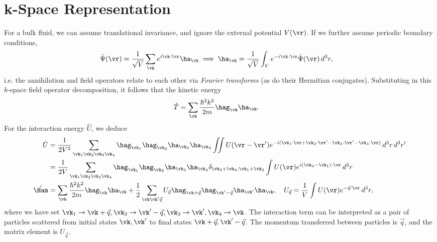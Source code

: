 \documentclass[a4paper, 11pt, normalem]{report}
\begin{document}
\section{k-Space Representation}
For a bulk fluid, we can assume translational invariance, and ignore the external potential $V(\vr)$.
If we further assume periodic boundary conditions,
\begin{align}
    \hat{\Psi}(\vr) &= \frac{1}{\sqrt{V}}\sum_{\vk}e^{i\vk\cdot\vr}\ha_{\vk} \implies \ha_{\vk} = \frac{1}{\sqrt{V}} \int_V e^{-i\vk\cdot\vr}\hat{\Psi}(\vr)\,d^3r,
\end{align}
i.e. the annihilation and field operators relate to each other via \emph{Fourier transforms} (as do their Hermitian conjugates).
Substituting in this $k$-space field operator decomposition, it follows that the kinetic energy
\begin{align}
    \hat{T} &= \sum_{\vk} \frac{\hbar^2k^2}{2m}\hag_{\vk}\ha_{\vk}.
\end{align}
For the interaction energy $\hat{U}$, we deduce
\begin{align}
    \hat{U} &= \frac{1}{2V^2} \sum_{\vk_1\vk_2\vk_3\vk_4} \hag_{\vk_1}\hag_{\vk_2}\ha_{\vk_3}\ha_{\vk_4}\iint U(\vr-\vr')e^{-i(\vk_1\cdot\vr + \vk_2\cdot\vr' - \vk_3\cdot\vr' - \vk_4\cdot\vr)}\,d^3r\,d^3r'  \\
            &= \frac{1}{2V} \sum_{\vk_1\vk_2\vk_3\vk_4} \hag_{\vk_1}\hag_{\vk_2}\ha_{\vk_3}\ha_{\vk_4}\delta_{\vk_3+\vk_4,\vk_1+\vk_2} \int U(\vr)e^{i(\vk_4-\vk_1)\cdot\vr}\,d^3r \\
    \hat{\Ham} &= \sum_{\vk} \frac{\hbar^2k^2}{2m}\hag_{\vk}\ha_{\vk} + \frac12 \sum_{\vk\vk'\vec{q}} U_{\vec{q}}\hag_{\vk+\vec{q}}\hag_{\vk'-\vec{q}}\ha_{\vk'}\ha_{\vk}, \quad U_{\vec{q}} = \frac{1}{V}\int U(\vr)e^{-\vec{q}\cdot\vr}\,d^3r,
\end{align}
where we have set $\vk_1\to\vk+\vec{q}, \vk_2\to\vk'-\vec{q}, \vk_3\to\vk', \vk_4\to\vk$.
The interaction term can be interpreted as a pair of particles scattered from initial states $\vk,\vk'$ to final states $\vk+\vec{q},\vk'-\vec{q}$.
The momentum transferred between particles is $\vec{q}$, and the matrix element is $U_{\vec{q}}$.
\end{document}
